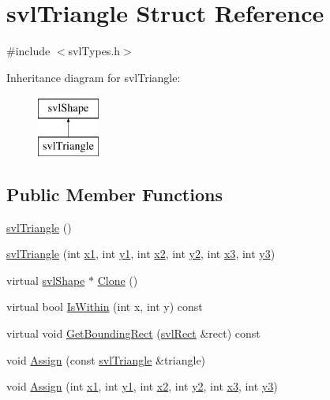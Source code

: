 \hypertarget{structsvl_triangle}{}\section{svl\+Triangle Struct Reference}
\label{structsvl_triangle}


{\ttfamily \#include $<$svl\+Types.\+h$>$}

Inheritance diagram for svl\+Triangle\+:\begin{figure}[H]
\begin{center}
\leavevmode
\includegraphics[height=2.000000cm]{d9/d37/structsvl_triangle}
\end{center}
\end{figure}
\subsection*{Public Member Functions}
\begin{DoxyCompactItemize}
\item 
\hyperlink{structsvl_triangle_a972f66b1feca53a63b56d1a3abb8d489}{svl\+Triangle} ()
\item 
\hyperlink{structsvl_triangle_a0457b9deae5506333a0a25cb1a637bb8}{svl\+Triangle} (int \hyperlink{structsvl_triangle_aadd880d75747824dc68592b008cc622f}{x1}, int \hyperlink{structsvl_triangle_a8d2d2e3a7518fbe2dd54ae83295a5564}{y1}, int \hyperlink{structsvl_triangle_a0d54bb4e6b2a9a776c7934f98ab615f2}{x2}, int \hyperlink{structsvl_triangle_a5b846c983e7fb8778b41310ecccb31d6}{y2}, int \hyperlink{structsvl_triangle_a55e31484afa1dd95b65fed71acd32798}{x3}, int \hyperlink{structsvl_triangle_ac077e0223f63837cc3d6013935141db6}{y3})
\item 
virtual \hyperlink{structsvl_shape}{svl\+Shape} $\ast$ \hyperlink{structsvl_triangle_a9496d2664a725963ae1ffb9224608f1f}{Clone} ()
\item 
virtual bool \hyperlink{structsvl_triangle_a8b3889641a78d62ae2f783d104896fff}{Is\+Within} (int x, int y) const 
\item 
virtual void \hyperlink{structsvl_triangle_a9c0deece2817c6249bf1959e0571956f}{Get\+Bounding\+Rect} (\hyperlink{structsvl_rect}{svl\+Rect} \&rect) const 
\item 
void \hyperlink{structsvl_triangle_a99d9927c203f27da699fe9aaa85f656e}{Assign} (const \hyperlink{structsvl_triangle}{svl\+Triangle} \&triangle)
\item 
void \hyperlink{structsvl_triangle_a049f52af5212130ef47e61851a4cb901}{Assign} (int \hyperlink{structsvl_triangle_aadd880d75747824dc68592b008cc622f}{x1}, int \hyperlink{structsvl_triangle_a8d2d2e3a7518fbe2dd54ae83295a5564}{y1}, int \hyperlink{structsvl_triangle_a0d54bb4e6b2a9a776c7934f98ab615f2}{x2}, int \hyperlink{structsvl_triangle_a5b846c983e7fb8778b41310ecccb31d6}{y2}, int \hyperlink{structsvl_triangle_a55e31484afa1dd95b65fed71acd32798}{x3}, int \hyperlink{structsvl_triangle_ac077e0223f63837cc3d6013935141db6}{y3})
\end{DoxyCompactItemize}

